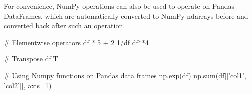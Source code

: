 

For convenience, NumPy operations can also be used to operate on Pandas DataFrames, which are automatically converted to NumPy ndarrays before and converted back after such an operation. 

\begin{samepage}
\begin{pythoncode}
# Elementwise operators
df * 5 + 2
1/df
df**4

# Transpose
df.T

# Using Numpy functions on Pandas data frames
np.exp(df)
np.sum(df[['col1', 'col2']], axis=1)
\end{pythoncode}
\end{samepage}





